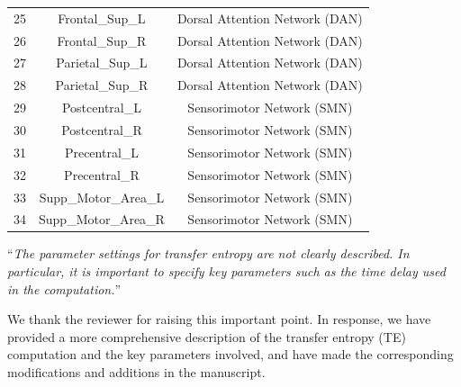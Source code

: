 \documentclass[lettersize,journal]{IEEEtran}
\begin{document}
\begin{table}[htbp]
\begin{tabular}{ccc}
25 & Frontal\_Sup\_L       & Dorsal Attention Network (DAN) \\
26 & Frontal\_Sup\_R       & Dorsal Attention Network (DAN) \\
27 & Parietal\_Sup\_L      & Dorsal Attention Network (DAN) \\
28 & Parietal\_Sup\_R      & Dorsal Attention Network (DAN) \\
29 & Postcentral\_L        & Sensorimotor Network (SMN) \\
30 & Postcentral\_R        & Sensorimotor Network (SMN) \\
31 & Precentral\_L         & Sensorimotor Network (SMN) \\
32 & Precentral\_R         & Sensorimotor Network (SMN) \\
33 & Supp\_Motor\_Area\_L  & Sensorimotor Network (SMN) \\
34 & Supp\_Motor\_Area\_R  & Sensorimotor Network (SMN) \\
\bottomrule
\end{tabular}
\end{table}

\newpage

\vspace{4mm}

 ``{\it The parameter settings for transfer entropy are not clearly described. In particular, it is important to specify key parameters such as the time delay used in the computation.}''
\vspace{1mm}


We thank the reviewer for raising this important point. In response, we have provided a more comprehensive description of the transfer entropy (TE) computation and the key parameters involved, and have made the corresponding modifications and additions in the manuscript.
\end{document}
